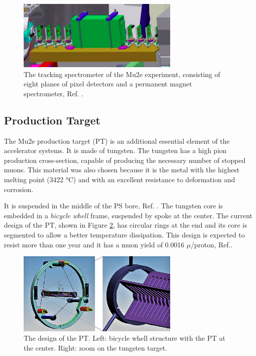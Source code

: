\begin{figure}[!h]
\centering
\includegraphics[width =0.7\textwidth]{figures/png/Screenshot_20240306_184720.png}
\caption{The tracking spectrometer of the Mu2e experiment, consisting of eight planes of pixel detectors and a permanent magnet spectrometer, Ref. \cite{Prebys:IPAC2015-THPF121}.}
\label{fig:extintionmonitor}
\end{figure}
\subsection{Production Target}
The Mu2e production target (PT) is an additional essential element of the 
accelerator systems. It is made of tungsten. 
The tungsten has a high pion production cross-section, 
capable of producing the necessary number of stopped muons. 
This material was also chosen because it is the metal with the highest
melting point (3422 °C) and with an excellent resistance to deformation and corrosion.

It is suspended in the middle of the PS bore, Ref. \cite{bartoszek2015mu2e}.
The tungsten core is embedded in a \textit{bicycle whell} frame, 
suspended by spoke at the center. The current design of the PT, shown in Figure \ref{fig:PT}, 
has circular rings at the end and its core is segmented to allow a better temperature 
dissipation. This design is expected to resist more than one year and it has a muon yield
of 0.0016 $\mu$/proton, Ref.\cite{PT}.
\begin{figure}[!h]
    \centering
    \includegraphics[width =0.7\textwidth]{figures/png/Screenshot_20240706_114229.png}
    \caption{The design of the PT. Left: bicycle whell structure with the PT at the
    center. Right: zoom on the tungsten target.}
    \label{fig:PT}
\end{figure}

